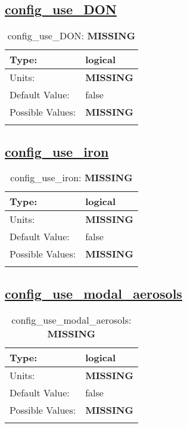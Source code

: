\subsection[config\_use\_DON]{\hyperref[sec:nm_tab_biogeochemistry]{config\_use\_DON}}
\label{subsec:nm_sec_config_use_DON}
\begin{center}
\begin{longtable}{| p{2.0in} || p{4.0in} |}
    \hline
    Type: & logical \\
    \hline
    Units: & {\bf \color{red} MISSING} \\
    \hline
    Default Value: & false \\
    \hline
    Possible Values: & {\bf \color{red} MISSING} \\
    \hline
    \caption{config\_use\_DON: {\bf \color{red} MISSING}}
\end{longtable}
\end{center}
\subsection[config\_use\_iron]{\hyperref[sec:nm_tab_biogeochemistry]{config\_use\_iron}}
\label{subsec:nm_sec_config_use_iron}
\begin{center}
\begin{longtable}{| p{2.0in} || p{4.0in} |}
    \hline
    Type: & logical \\
    \hline
    Units: & {\bf \color{red} MISSING} \\
    \hline
    Default Value: & false \\
    \hline
    Possible Values: & {\bf \color{red} MISSING} \\
    \hline
    \caption{config\_use\_iron: {\bf \color{red} MISSING}}
\end{longtable}
\end{center}
\subsection[config\_use\_modal\_aerosols]{\hyperref[sec:nm_tab_biogeochemistry]{config\_use\_modal\_aerosols}}
\label{subsec:nm_sec_config_use_modal_aerosols}
\begin{center}
\begin{longtable}{| p{2.0in} || p{4.0in} |}
    \hline
    Type: & logical \\
    \hline
    Units: & {\bf \color{red} MISSING} \\
    \hline
    Default Value: & false \\
    \hline
    Possible Values: & {\bf \color{red} MISSING} \\
    \hline
    \caption{config\_use\_modal\_aerosols: {\bf \color{red} MISSING}}
\end{longtable}
\end{center}
